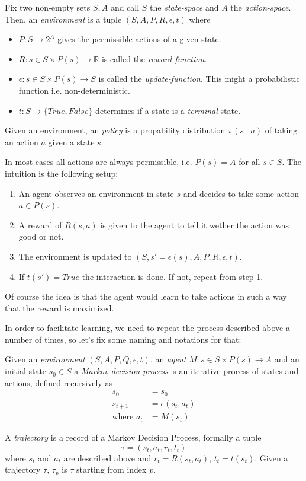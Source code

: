 \documentclass{article}
\theoremstyle{changedot}
\theoremstyle{changedotbreak}
\theoremstyle{nonumberplain}
\begin{document}
\begin{definition}
  Fix two non-empty sets $S, A$ and call $S$ the \emph{state-space} and $A$ the \emph{action-space}. Then, an \emph{environment} is a tuple $(S, A, P, R, \epsilon, t)$ where
  \begin{itemize}
    \item $P : S \to 2^{A}$ gives the permissible actions of a given state.
    \item $R : s\in S \times P(s) \to \mathbb R$ is called the \emph{reward-function}.
    \item $\epsilon : s\in S \times P(s) \to S$ is called the \emph{update-function}. This might a probabilistic function i.e. non-deterministic.
    \item $t : S \to \{True, False\}$ determines if a state is a \emph{terminal} state.
  \end{itemize}

  Given an environment, an \emph{policy} is a propability distribution $\pi(s \mid a)$ of taking an action $a$ given a state $s$.
\end{definition}

In most cases all actions are always permissible, i.e. $P(s) = A$ for all $s \in S$. The intuition is the following setup:
\begin{enumerate}
  \item An agent observes an environment in state $s$ and decides to take some action $a \in P(s)$.
  \item A reward of $R(s, a)$ is given to the agent to tell it wether the action was good or not.
  \item The environment is updated to $(S, s'=\epsilon(s), A, P, R, \epsilon, t)$.
    \item If $t(s') = True$ the interaction is done. If not, repeat from step 1.
\end{enumerate}

Of course the idea is that the agent would learn to take actions in such a way that the reward is maximized.

In order to facilitate learning, we need to repeat the process described above a number of times, so let's fix some naming and notations for that:

\begin{definition}
  Given an \emph{environment} $(S, A, P, Q, \epsilon, t)$, an \emph{agent} $M : s \in S \times P(s) \to A$ and an initial state $s_{0} \in S$ a \emph{Markov decision process} is an iterative process of states and actions, defined recursively as
  \begin{align}
    s_{0} &= s_{0} \\
    s_{t+1} &= \epsilon(s_{t}, a_{t}) \\
    \text{where } a_{t} &= M(s_{t})
  \end{align}

  A \emph{trajectory} is a record of a Markov Decision Process, formally a tuple \[\tau = (s_{t}, a_{t}, r_{t}, t_{t})\] where $s_{t}$ and $a_{t}$ are described above and $r_{t} = R(s_{t}, a_{t})$, $t_{t} = t(s_{t})$. Given a trajectory $\tau$, $\tau_{p}$ is $\tau$ starting from index $p$.
\end{definition}
\end{document}
